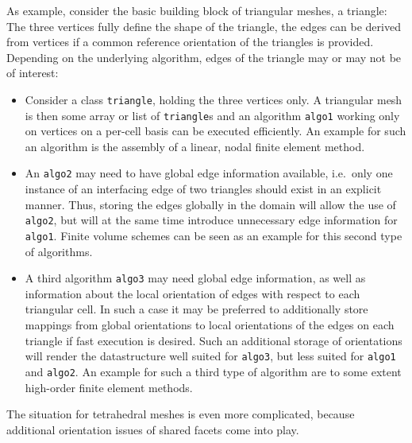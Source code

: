 As example, consider the basic building block of triangular meshes, a triangle: The three vertices fully define the shape of the triangle, the edges can be derived from vertices if a common reference orientation of the triangles is provided. Depending on the underlying algorithm, edges of the triangle may or may not be of interest:
\begin{itemize}
 \item Consider a class \lstinline|triangle|, holding the three vertices only. A triangular mesh is then some array or list of \lstinline|triangle|s and an algorithm \texttt{algo1} working only on vertices on a per-cell basis can be executed efficiently. An example for such an algorithm is the assembly of a linear, nodal finite element method.

 \item An \texttt{algo2} may need to have global edge information available, i.e.~only one instance of an interfacing edge of two triangles should exist in an explicit manner.
       Thus, storing the edges globally in the domain will allow the use of \texttt{algo2}, but will at the same time introduce unnecessary edge information for \texttt{algo1}. Finite volume schemes can be seen as an example for this second type of algorithms.

 \item A third algorithm \texttt{algo3} may need global edge information, as well as information about the local orientation of edges with respect to each triangular cell.
      In such a case it may be preferred to additionally store mappings from global orientations to local orientations of the edges on each triangle if fast execution is desired.
      Such an additional storage of orientations will render the datastructure well suited for \texttt{algo3}, but less suited for \texttt{algo1} and \texttt{algo2}.
      An example for such a third type of algorithm are to some extent high-order finite element methods.
\end{itemize}
The situation for tetrahedral meshes is even more complicated, because additional orientation issues of shared facets come into play.

